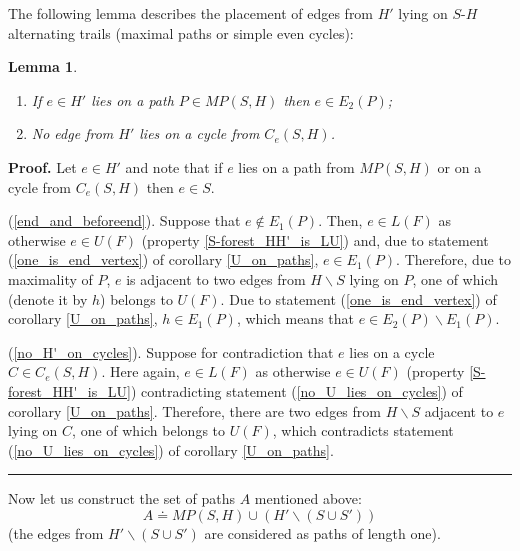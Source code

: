 \documentclass[a4paper, 12pt]{article}
\newtheorem{lemma}{Lemma}[subsection]
\newenvironment{proof}[1][Proof]{\noindent\textbf{#1.} }{\ \rule{0.5em}{0.5em}}
\begin{document}
\bigskip

The following lemma describes the placement of edges from $H'$ lying
on $S$-$H$ alternating trails (maximal paths or simple even cycles):
\begin{lemma} \label{H'on_paths}\
\renewcommand{\labelenumi}{(\arabic{enumi})}
\begin{enumerate}
\item \label{end_and_beforeend} If $e \in H'$ lies on a path $P \in
MP(S,H)$ then $e \in E_2(P)$;
\item \label{no_H'_on_cycles} No edge from $H'$ lies on a cycle from
$C_e(S,H)$.
\end{enumerate}
\end{lemma}
\begin{proof}
Let $e \in H'$ and note that if $e$ lies on a path from $MP(S,H)$ or
on a cycle from $C_e(S,H)$ then $e \in S$.

(\ref{end_and_beforeend}). Suppose that $e \notin E_1(P)$. Then, $e
\in L(F)$ as otherwise $e \in U(F)$ (property
\ref{S-forest_HH'_is_LU}) and, due to statement
(\ref{one_is_end_vertex}) of corollary \ref{U_on_paths}, $e \in
E_1(P)$. Therefore, due to maximality of $P$, $e$ is adjacent to two
edges from $H \backslash S$ lying on $P$, one of which (denote it by
$h$) belongs to $U(F)$. Due to statement (\ref{one_is_end_vertex})
of corollary \ref{U_on_paths}, $h \in E_1(P)$, which means that $e
\in E_2(P) \backslash E_1(P)$.

(\ref{no_H'_on_cycles}). Suppose for contradiction that $e$ lies on
a cycle $C \in C_e(S,H)$. Here again, $e \in L(F)$ as otherwise $e
\in U(F)$ (property \ref{S-forest_HH'_is_LU}) contradicting
statement (\ref{no_U_lies_on_cycles}) of corollary \ref{U_on_paths}.
Therefore, there are two edges from $H \backslash S$ adjacent to $e$
lying on $C$, one of which belongs to $U(F)$, which contradicts
statement (\ref{no_U_lies_on_cycles}) of corollary \ref{U_on_paths}.
\end{proof}

\bigskip

Now let us construct the set of paths $A$ mentioned above:
$$A \doteq MP(S,H) \cup (H' \backslash (S \cup S'))$$
(the edges from $H' \backslash (S \cup S')$ are considered as paths
of length one).
\end{document}
